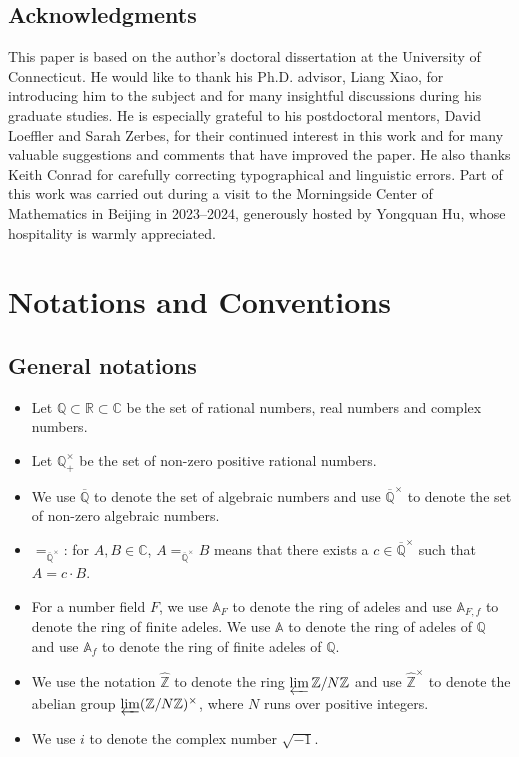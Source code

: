 \documentclass[11pt, a4paper]{amsart}
\theoremstyle{plain}
\theoremstyle{definition}
\numberwithin{equation}{section}
\def\AAA{\mathbb{A}}
\def\CC{\mathbb{C}}
\def\QQ{\mathbb{Q}}
\def\RR{\mathbb{R}}
\def\ZZ{\mathbb{Z}}
\begin{document}
\subsection*{Acknowledgments}
This paper is based on the author’s doctoral dissertation at the University of Connecticut. He would like to thank his Ph.D. advisor, Liang Xiao, for introducing him to the subject and for many insightful discussions during his graduate studies. He is especially grateful to his postdoctoral mentors, David Loeffler and Sarah Zerbes, for their continued interest in this work and for many valuable suggestions and comments that have improved the paper. He also thanks Keith Conrad for carefully correcting typographical and linguistic errors. Part of this work was carried out during a visit to the Morningside Center of Mathematics in Beijing in 2023{--}2024, generously hosted by Yongquan Hu, whose hospitality is warmly appreciated.




\section{Notations and Conventions}
\subsection*{General notations}

\begin{itemize}
    \item Let $\QQ \subset \RR \subset \CC$ be the set of rational numbers, real numbers and complex numbers. 
    \item Let $\QQ^{\times}_{+}$ be the set of non-zero positive rational numbers. 
    \item We use $\overline{\QQ}$ to denote the set of algebraic numbers and use $\overline{\QQ}^{\times}$ to denote the set of non-zero algebraic numbers. 
    \item $=_{\overline{\QQ}^{\times}}$: for $A, B \in \CC$, $A =_{\overline{\QQ}^{\times}} B$ means that there exists a $c \in \overline{\QQ}^{\times}$ such that $A = c \cdot B$. 
    \item For a number field $F$, we use $\AAA_{F}$ to denote the ring of adeles and use $\AAA_{F, f}$ to denote the ring of finite adeles. We use $\AAA$ to denote the ring of adeles of $\QQ$ and use $\AAA_{f}$ to denote the ring of finite adeles of $\QQ$.
    \item We use the notation $\hat{\ZZ}$ to denote the ring $\varprojlim \ZZ / N \ZZ$ and use $\hat{\ZZ}^{\times}$ to denote the abelian group $\varprojlim (\ZZ / N \ZZ)^{\times}$, where $N$ runs over positive integers.
    \item We use $i$ to denote the complex number $\sqrt{-1}$.
\end{itemize}
\end{document}
